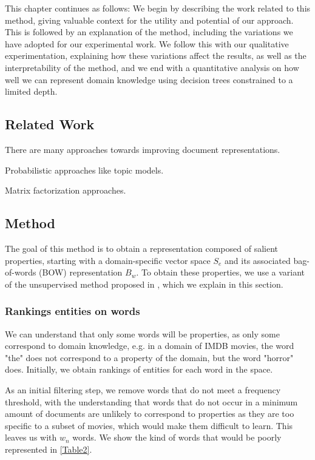 \documentclass{article}
\begin{document}
This chapter continues as follows: We begin by describing the work related to this method, giving valuable context for the utility and potential of our approach. This is followed by an explanation of the method, including the variations we have adopted for our experimental work. We follow this with our qualitative experimentation, explaining how these variations affect the results, as well as the interpretability of the method, and we end with a quantitative analysis on how well we can represent domain knowledge using decision trees constrained to a limited depth.



\subsection{Related Work}
There are many approaches towards improving document representations. 

Probabilistic approaches like topic models.

Matrix factorization approaches.



\subsection{Method}
The goal of this method is to obtain a representation composed of salient properties, starting with a domain-specific vector space $S_e$ and its associated bag-of-words (BOW) representation $B_w$. To obtain these properties, we use a variant of the unsupervised method proposed in \cite{derracAIJ}, which we explain in this section. 
\subsubsection{Rankings entities on words}
 We can understand that only some words will be properties, as only some correspond to domain knowledge, e.g. in a domain of IMDB movies, the word "the" does not correspond to a property of the domain, but the word "horror" does. Initially, we obtain rankings of entities for each word in the space. 

As an initial filtering step, we remove words that do not meet a frequency threshold, with the understanding that words that do not occur in a minimum amount of documents are unlikely to correspond to properties as they are too specific to a subset of movies, which would make them difficult to learn. This leaves us with $w_n$ words. We show the kind of words that would be poorly represented  in \ref{Table2}.%
\end{document}
